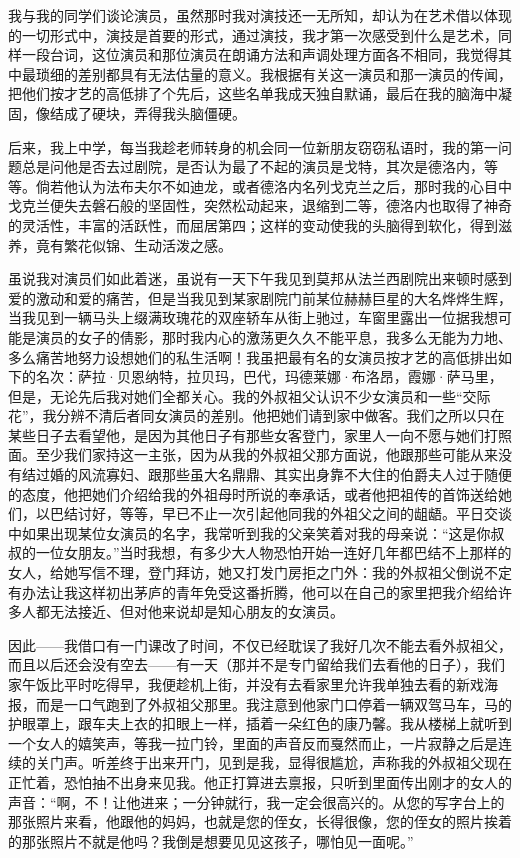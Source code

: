 \par 我与我的同学们谈论演员，虽然那时我对演技还一无所知，却认为在艺术借以体现的一切形式中，演技是首要的形式，通过演技，我才第一次感受到什么是艺术，同样一段台词，这位演员和那位演员在朗诵方法和声调处理方面各不相同，我觉得其中最琐细的差别都具有无法估量的意义。我根据有关这一演员和那一演员的传闻，把他们按才艺的高低排了个先后，这些名单我成天独自默诵，最后在我的脑海中凝固，像结成了硬块，弄得我头脑僵硬。
\par 后来，我上中学，每当我趁老师转身的机会同一位新朋友窃窃私语时，我的第一问题总是问他是否去过剧院，是否认为最了不起的演员是戈特，其次是德洛内，等等。倘若他认为法布夫尔不如迪龙，或者德洛内名列戈克兰之后，那时我的心目中戈克兰便失去磐石般的坚固性，突然松动起来，退缩到二等，德洛内也取得了神奇的灵活性，丰富的活跃性，而屈居第四；这样的变动使我的头脑得到软化，得到滋养，竟有繁花似锦、生动活泼之感。
\par 虽说我对演员们如此着迷，虽说有一天下午我见到莫邦从法兰西剧院出来顿时感到爱的激动和爱的痛苦，但是当我见到某家剧院门前某位赫赫巨星的大名烨烨生辉，当我见到一辆马头上缀满玫瑰花的双座轿车从街上驰过，车窗里露出一位据我想可能是演员的女子的倩影，那时我内心的激荡更久久不能平息，我多么无能为力地、多么痛苦地努力设想她们的私生活啊！我虽把最有名的女演员按才艺的高低排出如下的名次：萨拉·贝恩纳特，拉贝玛，巴代，玛德莱娜·布洛昂，霞娜·萨马里，但是，无论先后我对她们全都关心。我的外叔祖父认识不少女演员和一些“交际花”，我分辨不清后者同女演员的差别。他把她们请到家中做客。我们之所以只在某些日子去看望他，是因为其他日子有那些女客登门，家里人一向不愿与她们打照面。至少我们家持这一主张，因为从我的外叔祖父那方面说，他跟那些可能从来没有结过婚的风流寡妇、跟那些虽大名鼎鼎、其实出身靠不大住的伯爵夫人过于随便的态度，他把她们介绍给我的外祖母时所说的奉承话，或者他把祖传的首饰送给她们，以巴结讨好，等等，早已不止一次引起他同我的外祖父之间的龃龉。平日交谈中如果出现某位女演员的名字，我常听到我的父亲笑着对我的母亲说：“这是你叔叔的一位女朋友。”当时我想，有多少大人物恐怕开始一连好几年都巴结不上那样的女人，给她写信不理，登门拜访，她又打发门房拒之门外：我的外叔祖父倒说不定有办法让我这样初出茅庐的青年免受这番折腾，他可以在自己的家里把我介绍给许多人都无法接近、但对他来说却是知心朋友的女演员。
\par 因此——我借口有一门课改了时间，不仅已经耽误了我好几次不能去看外叔祖父，而且以后还会没有空去——有一天（那并不是专门留给我们去看他的日子），我们家午饭比平时吃得早，我便趁机上街，并没有去看家里允许我单独去看的新戏海报，而是一口气跑到了外叔祖父那里。我注意到他家门口停着一辆双驾马车，马的护眼罩上，跟车夫上衣的扣眼上一样，插着一朵红色的康乃馨。我从楼梯上就听到一个女人的嬉笑声，等我一拉门铃，里面的声音反而戛然而止，一片寂静之后是连续的关门声。听差终于出来开门，见到是我，显得很尴尬，声称我的外叔祖父现在正忙着，恐怕抽不出身来见我。他正打算进去禀报，只听到里面传出刚才的女人的声音：“啊，不！让他进来；一分钟就行，我一定会很高兴的。从您的写字台上的那张照片来看，他跟他的妈妈，也就是您的侄女，长得很像，您的侄女的照片挨着的那张照片不就是他吗？我倒是想要见见这孩子，哪怕见一面呢。”
